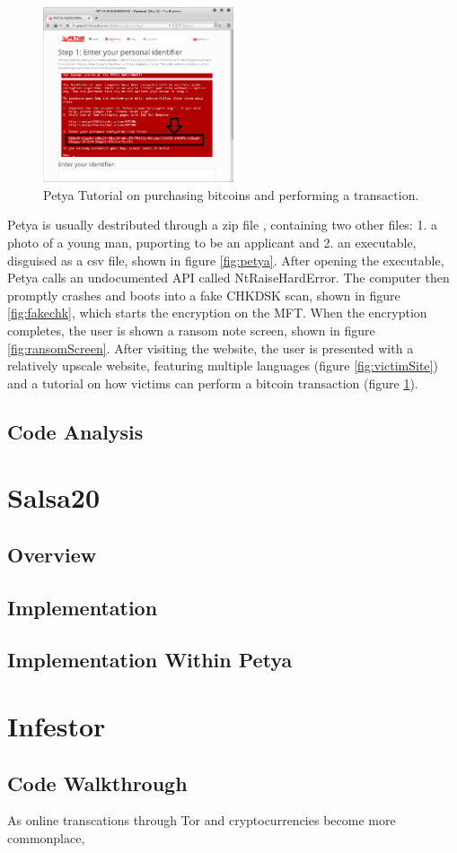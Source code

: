 \documentclass[twocolumn]{article}
\begin{document}
\begin{figure}
	\includegraphics[width = 0.5\textwidth]{victimTutorial.png}
	\caption{Petya Tutorial on purchasing bitcoins and performing a transaction. }
	\label{fig:victimTutorial}
\end{figure}
Petya is usually destributed through a zip file \cite{lowLevelPetya}, containing two other files: 1. a photo of a young man, puporting to be an applicant and 2. an executable, disguised as a csv file, shown in figure \ref{fig:petya}. 
After opening the executable, Petya calls an undocumented API called NtRaiseHardError. The computer then promptly crashes and boots into a fake CHKDSK scan, shown in figure \ref{fig:fakechk}, which starts the encryption on the MFT. When the encryption completes, the user is shown a ransom note screen, shown in figure \ref{fig:ransomScreen}. After visiting the website, the user is presented with a relatively upscale website, featuring multiple languages (figure \ref{fig:victimSite}) and a tutorial on how victims can perform a bitcoin transaction (figure \ref{fig:victimTutorial}). 
\subsection{Code Analysis}

\section{Salsa20}
\subsection{Overview}
\subsection{Implementation}
\subsection{Implementation Within Petya}

\section{Infestor}
\subsection{Code Walkthrough}


As online transcations through Tor \cite{tor} and cryptocurrencies become more commonplace, 
 
\end{document}
